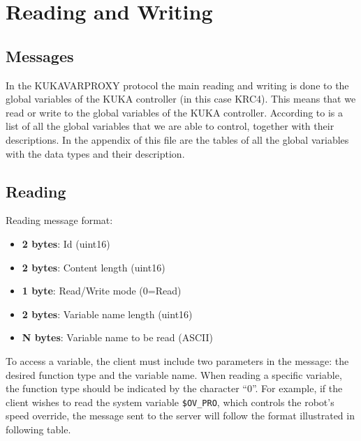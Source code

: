 \section{Reading and Writing}

\subsection{Messages}

In the KUKAVARPROXY protocol the main reading and writing is done to the global variables of the KUKA controller (in this case KRC4).
This means that we read or write to the global variables of the KUKA controller.
According to \cite{openkuka_system_variables} is a list of all the global variables that we are able to control, together with their descriptions.
In the appendix of this file are the tables of all the global variables with the data types and their description.

\subsection{Reading}
Reading message format:
\begin{itemize}
    \item \textbf{2 bytes}: Id (uint16)
    \item \textbf{2 bytes}: Content length (uint16)
    \item \textbf{1 byte}: Read/Write mode (0=Read)
    \item \textbf{2 bytes}: Variable name length (uint16)
    \item \textbf{N bytes}: Variable name to be read (ASCII)
\end{itemize}
To access a variable, 
the client must include two parameters 
in the message: the desired function 
type and the variable name. 
When reading a specific variable, 
the function type should be indicated 
by the character “0”. For example, 
if the client wishes to read the system 
variable \texttt{\$OV\_PRO}, which 
controls the robot's speed override, 
the message sent to the server will 
follow the format illustrated in 
following table\cite{sanfilippo2014jopenshowvar}.

